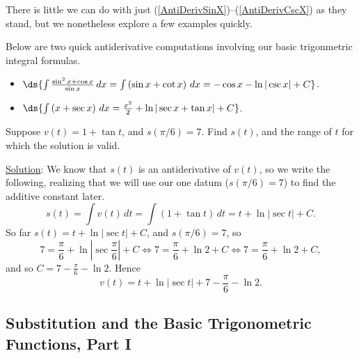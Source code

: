 There is little we can do with just 
(\ref{AntiDerivSinX})--(\ref{AntiDerivCscX}) as they stand,
but we nonetheless explore a few examples quickly.

\bex Below are two quick antiderivative computations involving our
basic trigonmetric integral formulas.
\begin{itemize}
\item $\ds{\int\frac{\sin^2 x+\cos x}{\sin x}\,dx
  =\int\left(\sin x+\cot x\right)\,dx=-\cos x-\ln|\csc x|+C}$.
\item $\ds{\int\left(x+\sec x\right)\,dx
  =\frac{x^2}2+\ln|\sec x+\tan x|+C}$.
\end{itemize}
\eex

\bex Suppose $v(t)=1+\tan t$, and $s(\pi/6)=7$.  Find $s(t)$, and
the range of $t$ for which the solution is valid.

\underline{Solution}: We know that $s(t)$ is an antiderivative
of $v(t)$, so we write the following, realizing that we will use
our one datum ($s(\pi/6)=7$) to find the additive constant later.
$$s(t)=\int v(t)\,dt=\int(1+\tan t)\,dt=t+\ln|\sec t|+C.$$
So far $s(t)=t+\ln|\sec t|+C$, and $s({\pi}/6)=7$, so
$$7=\frac{\pi}6+\ln\left|\sec\frac{\pi}6\right|+C\iff 
7=\frac{\pi}6+\ln2+C\iff 7=\frac{\pi}6+\ln2+C,$$
and so $C=7-\frac{\pi}6-\ln2$.  Hence 
$$v(t)=t+\ln|\sec t|+7-\frac{\pi}6-\ln2.$$
\eex

\subsection{Substitution and the Basic Trigonometric Functions, Part I}

